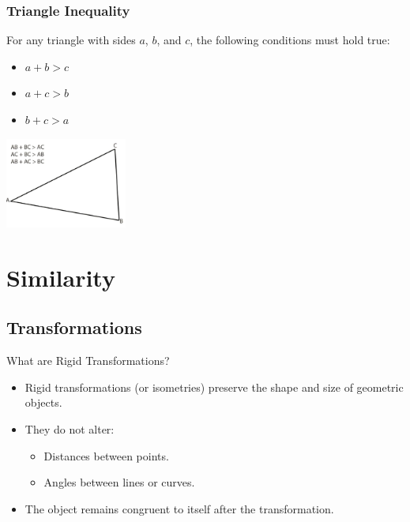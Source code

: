 \documentclass{beamer}
\begin{document}
\begin{frame}
    \frametitle{Triangle Inequality}
    \begin{block}{}
        For any triangle with sides \(a\), \(b\), and \(c\), the following conditions must hold true:
         \begin{itemize}
                \item \( a + b > c \)
                \item \( a + c > b \)
                \item \( b + c > a \)
        \end{itemize}
    \end{block}
    \begin{center}
        \includegraphics[width=0.3\textwidth]{triangle_inequality.jpeg} 
    \end{center}
\end{frame}

\section{Similarity}

\subsection{Transformations}



    
    \begin{frame}{What are Rigid Transformations?}
        \begin{itemize}
            \item Rigid transformations (or isometries) preserve the shape and size of geometric objects.
            \item They do not alter:
            \begin{itemize}
                \item Distances between points.
                \item Angles between lines or curves.
            \end{itemize}
            \item The object remains congruent to itself after the transformation.
        \end{itemize}
    \end{frame}
    
\end{document}
